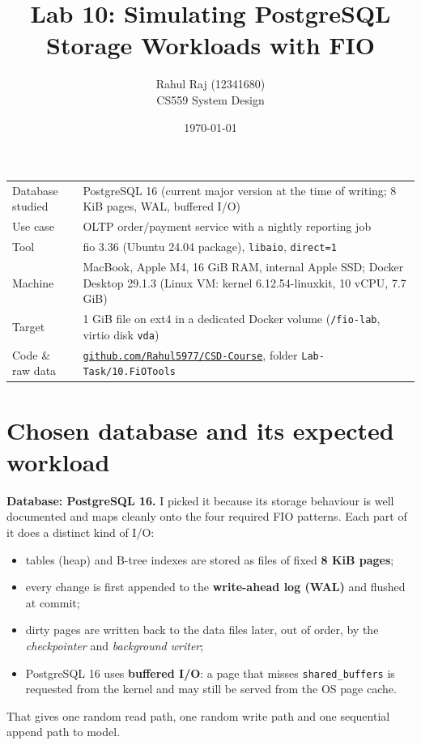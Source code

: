 \documentclass[11pt,a4paper]{article}
\title{\textbf{Lab 10: Simulating PostgreSQL Storage Workloads with FIO}}
\author{Rahul Raj \quad (12341680)\\\small CS559 System Design}
\date{\today}
\newcommand{\repo}{https://github.com/Rahul5977/CSD-Course/tree/main/Lab-Task/10.FiOTools}
\begin{document}
\maketitle

\begin{center}
\begin{tabularx}{\linewidth}{@{}lL@{}}
\toprule
Database studied & PostgreSQL 16 (current major version at the time of writing; 8 KiB pages, WAL, buffered I/O) \\
Use case & OLTP order/payment service with a nightly reporting job \\
Tool & fio 3.36 (Ubuntu 24.04 package), \texttt{libaio}, \texttt{direct=1} \\
Machine & MacBook, Apple M4, 16 GiB RAM, internal Apple SSD; Docker Desktop 29.1.3 (Linux VM: kernel 6.12.54-linuxkit, 10 vCPU, 7.7 GiB) \\
Target & 1 GiB file on ext4 in a dedicated Docker volume (\texttt{/fio-lab}, virtio disk \texttt{vda}) \\
Code \& raw data & \href{\repo}{\texttt{github.com/Rahul5977/CSD-Course}}, folder \texttt{Lab-Task/10.FiOTools} \\
\bottomrule
\end{tabularx}
\end{center}

\section{Chosen database and its expected workload}

\textbf{Database: PostgreSQL 16.} I picked it because its storage behaviour is well documented and maps
cleanly onto the four required FIO patterns. Each part of it does a distinct kind of I/O:
\begin{itemize}
  \item tables (heap) and B-tree indexes are stored as files of fixed \textbf{8 KiB pages};
  \item every change is first appended to the \textbf{write-ahead log (WAL)} and flushed at commit;
  \item dirty pages are written back to the data files later, out of order, by the
        \emph{checkpointer} and \emph{background writer};
  \item PostgreSQL 16 uses \textbf{buffered I/O}: a page that misses \texttt{shared\_buffers} is
        requested from the kernel and may still be served from the OS page cache.
\end{itemize}
That gives one random read path, one random write path and one sequential append path to model.
\end{document}
